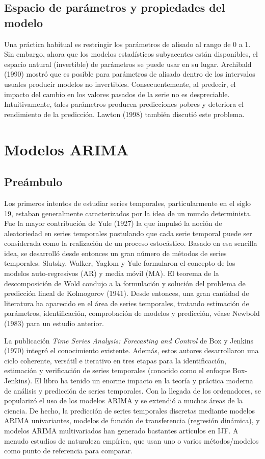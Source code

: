 \documentclass{llncs}
\begin{document}
\subsection{Espacio de parámetros y propiedades del modelo}
Una práctica habitual es restringir los parámetros de alisado al rango de 0 a 1. Sin embargo, ahora que los modelos estadísticos subyacentes están disponibles, el espacio natural (invertible) de parámetros se puede usar en su lugar. Archibald (1990) \cite{Archibald1990199} mostró que es posible para parámetros de alisado dentro de los intervalos usuales producir modelos no invertibles. Consecuentemente, al predecir, el impacto del cambio en los valores pasados de la serie no es despreciable. Intuitivamente, tales parámetros producen predicciones pobres y deteriora el rendimiento de la predicción. Lawton (1998) \cite{Lawton1998393} también discutió este problema.

\section{Modelos ARIMA}
\subsection{Preámbulo}
Los primeros intentos de estudiar series temporales, particularmente en el siglo 19, estaban generalmente caracterizados por la idea de un mundo determinista. Fue la mayor contribución de Yule (1927) la que impulsó la noción de aleatoriedad en series temporales postulando que cada serie temporal puede ser considerada como la realización de un proceso estocástico. Basado en esa sencilla idea, se desarrolló desde entonces un gran número de métodos de series temporales. Slutsky, Walker, Yaglom y Yule formularon el concepto de los modelos auto-regresivos (AR) y media móvil (MA). El teorema de la descomposición de Wold condujo a la formulación y solución del problema de predicción lineal de Kolmogorov (1941). Desde entonces, una gran cantidad de literatura ha aparecido en el área de series temporales, tratando estimación de parámetros, identificación, comprobación de modelos y predicción, véase Newbold (1983) para un estudio anterior.

La publicación \emph{Time Series Analysis: Forecasting and Control} de Box y Jenkins (1970) integró el conocimiento existente. Además, estos autores desarrollaron una ciclo coherente, versátil e iterativo en tres etapas para la identificación, estimación y verificación de series temporales (conocido como el enfoque Box-Jenkins). El libro ha tenido un enorme impacto en la teoría y práctica moderna de análisis y predicción de series temporales. Con la llegada de los ordenadores, se popularizó el uso de los modelos ARIMA y se extendió a muchas áreas de la ciencia. De hecho, la predicción de series temporales discretas mediante modelos ARIMA univariantes, modelos de función de transferencia (regresión dinámica), y modelos ARIMA multivariados han generado bastantes artículos en IJF. A menudo estudios de naturaleza empírica, que usan uno o varios métodos/modelos como punto de referencia para comparar. 
\end{document}
